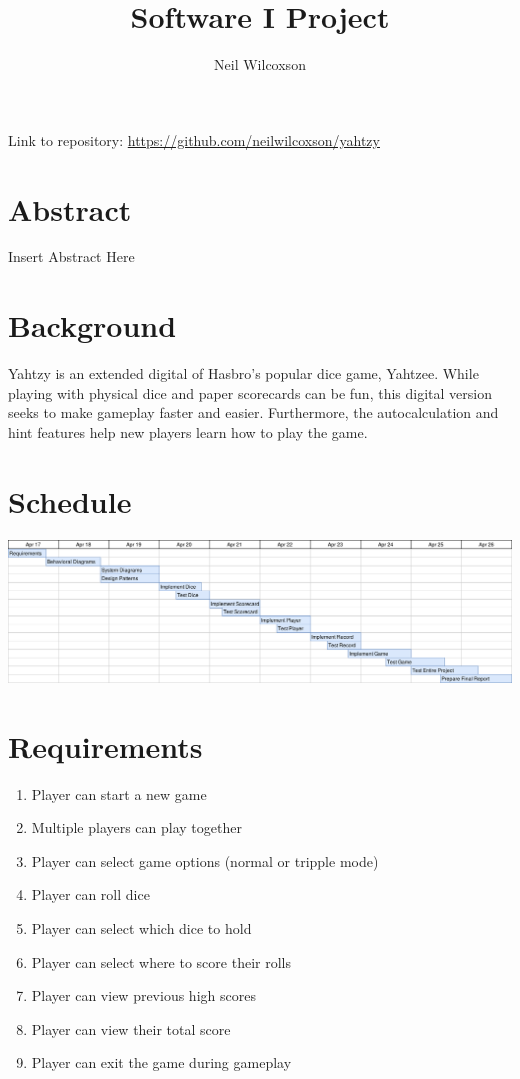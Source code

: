 \documentclass[12pt]{article}
\title{Software I Project}
\author{Neil Wilcoxson}
\begin{document}
\maketitle 
\thispagestyle{empty}

\noindent Link to repository: \newline
\url{https://github.com/neilwilcoxson/yahtzy}

\section*{Abstract}

Insert Abstract Here

\section*{Background}
Yahtzy is an extended digital of Hasbro's popular dice game, Yahtzee.  While playing with physical dice and paper scorecards can be fun, this digital version seeks to make gameplay faster and easier.  Furthermore, the autocalculation and hint features help new players learn how to play the game.

\section*{Schedule}
\includegraphics[scale=.16]{diagrams/gnatt.png}

\newpage
\section*{Requirements}
\begin{enumerate}
	\item Player can start a new game
	\item Multiple players can play together
	\item Player can select game options (normal or tripple mode)
	\item Player can roll dice
	\item Player can select which dice to hold
	\item Player can select where to score their rolls
	\item Player can view previous high scores
	\item Player can view their total score
	\item Player can exit the game during gameplay

\end{enumerate}
\end{document}
